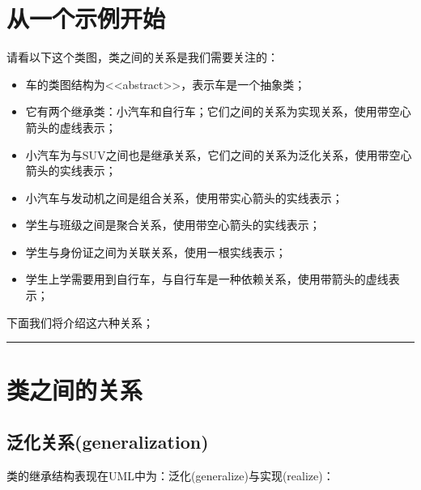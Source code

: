 \documentclass[letterpaper,10pt,english]{sphinxmanual}
\begin{document}
\section{从一个示例开始}
\label{\detokenize{read_uml:id1}}
\sphinxAtStartPar
请看以下这个类图，类之间的关系是我们需要关注的：

\noindent{}
\begin{itemize}
\item {} 
\sphinxAtStartPar
车的类图结构为\textless{}\textless{}abstract\textgreater{}\textgreater{}，表示车是一个抽象类；

\item {} 
\sphinxAtStartPar
它有两个继承类：小汽车和自行车；它们之间的关系为实现关系，使用带空心箭头的虚线表示；

\item {} 
\sphinxAtStartPar
小汽车为与SUV之间也是继承关系，它们之间的关系为泛化关系，使用带空心箭头的实线表示；

\item {} 
\sphinxAtStartPar
小汽车与发动机之间是组合关系，使用带实心箭头的实线表示；

\item {} 
\sphinxAtStartPar
学生与班级之间是聚合关系，使用带空心箭头的实线表示；

\item {} 
\sphinxAtStartPar
学生与身份证之间为关联关系，使用一根实线表示；

\item {} 
\sphinxAtStartPar
学生上学需要用到自行车，与自行车是一种依赖关系，使用带箭头的虚线表示；

\end{itemize}

\sphinxAtStartPar
下面我们将介绍这六种关系；


\bigskip\hrule\bigskip



\section{类之间的关系}
\label{\detokenize{read_uml:id2}}

\subsection{泛化关系(generalization)}
\label{\detokenize{read_uml:generalization}}
\sphinxAtStartPar
类的继承结构表现在UML中为：泛化(generalize)与实现(realize)：
\end{document}
